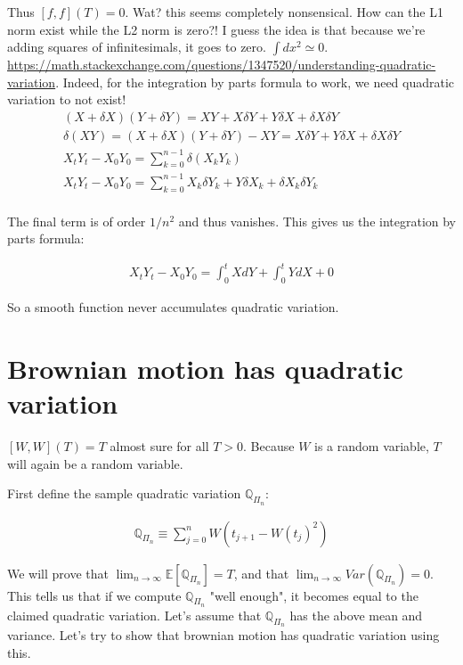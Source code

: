 \documentclass{book}
\newcommand{\Q}{\ensuremath{\mathbb{Q}}}
\newcommand{\E}{\ensuremath{\mathbb{E}}}
\theoremstyle{definition}
\begin{document}
Thus $[f, f](T) = 0$. Wat? this seems completely nonsensical. How can the L1 norm exist while the L2 norm is zero?!
I guess the idea is that because we're adding squares of infinitesimals, it goes to zero. $\int dx^2 \simeq 0$.
\href{math.se question about quadratic variation}{https://math.stackexchange.com/questions/1347520/understanding-quadratic-variation}. Indeed, for the integration by parts formula to work, we need quadratic variation to not exist!
\begin{align*}
(X + \delta X)(Y + \delta Y) = XY + X \delta Y + Y \delta X + \delta X \delta Y \\
\delta(XY) = (X + \delta X)(Y + \delta Y) - XY = X \delta Y + Y \delta X + \delta X \delta Y \\
X_t Y_t - X_0 Y_0  = \sum_{k=0}^{n-1} \delta(X_k Y_k) \\
X_t Y_t - X_0 Y_0  = \sum_{k=0}^{n-1} X_k \delta Y_k + Y \delta X_k + \delta X_k \delta Y_k \\ 
\end{align*}

The final term is of order $1/n^2$ and thus vanishes. This gives us the integration by parts formula:

\begin{align*}
X_t Y_t - X_0 Y_0  = \int_0^t X dY + \int_0^t Y dX + 0
\end{align*}

So a smooth function never accumulates quadratic variation.

\section{Brownian motion has quadratic variation}

$[W, W](T) = T$ almost sure for all $T > 0$. Because $W$ is a random variable,
$T$ will again be a random variable.


First define the sample quadratic variation $\Q_{\Pi_n}$:

\begin{align*}
\Q_{\Pi_n} 
\equiv \sum_{j=0}^n W(t_{j+1} - W(t_j)^2)
\end{align*}

We will prove that $\lim_{n \rightarrow \infty} \E[\Q_{\Pi_n}] = T$, and
that $\lim_{n \rightarrow \infty} Var(\Q_{\Pi_n}) = 0$. This tells us that
if we compute $\Q_{\Pi_n}$ "well enough", it becomes equal to the claimed
quadratic variation. Let's assume that $\Q_{\Pi_n}$ has the above mean and
variance. Let's try to show that brownian motion has quadratic variation using this.
\end{document}
